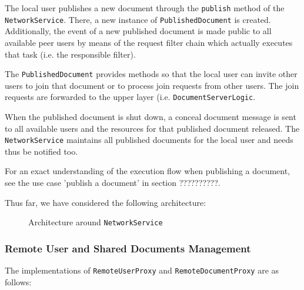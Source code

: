 The local user publishes a new document through the \texttt{publish} method of the \texttt{NetworkService}. There, a new instance of \texttt{PublishedDocument} is created. Additionally, the event of a new published document is made public to all available peer users by means of the request filter chain which actually executes that task (i.e. the responsible filter).

The \texttt{PublishedDocument} provides methods so that the local user can invite other users to join that document or to process join requests from other users. The join requests are forwarded to the upper layer (i.e. \texttt{DocumentServerLogic}. 

When the published document is shut down, a conceal document message is sent to all available users and the resources for that published document released. The \texttt{NetworkService} maintains all published documents for the local user and needs thus be notified too.

For an exact understanding of the execution flow when publishing a document, see the use case 'publish a document' in section ??????????.

Thus far, we have considered the following architecture:
\begin{figure}[H]
 \centering
 \caption{Architecture around \texttt{NetworkService}}
 \label{fig:network.protocol.architecture1.uml}
\end{figure}


\subsubsection{Remote User and Shared Documents Management}
The implementations of \texttt{RemoteUserProxy} and  \texttt{RemoteDocumentProxy} are as follows:

